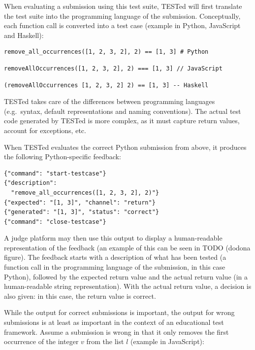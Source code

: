 \documentclass[../main]{subfiles}
\begin{document}
When evaluating a submission using this test suite, TESTed will first translate the test suite into the programming language of the submission.
Conceptually, each function call is converted into a test case (example in Python, JavaScript and Haskell):

\begin{verbatim}
remove_all_occurrences([1, 2, 3, 2], 2) == [1, 3] # Python
\end{verbatim}

\begin{verbatim}
removeAllOccurrences([1, 2, 3, 2], 2) === [1, 3] // JavaScript
\end{verbatim}

\begin{verbatim}
(removeAllOccurrences [1, 2, 3, 2] 2) == [1, 3] -- Haskell
\end{verbatim}

TESTed takes care of the differences between programming languages (e.g.\ syntax, default representations and naming conventions).
The actual test code generated by TESTed is more complex, as it must capture return values, account for exceptions, etc.

When TESTed evaluates the correct Python submission from above, it produces the following Python-specific feedback:

\begin{verbatim}
{"command": "start-testcase"}
{"description":
  "remove_all_occurrences([1, 2, 3, 2], 2)"}
{"expected": "[1, 3]", "channel": "return"}
{"generated": "[1, 3]", "status": "correct"}
{"command": "close-testcase"}
\end{verbatim}

A judge platform may then use this output to display a human-readable representation of the feedback (an example of this can be seen in TODO (dodona figure).
The feedback starts with a description of what has been tested (a function call in the programming language of the submission, in this case Python), followed by the expected return value and the actual return value (in a human-readable string representation).
With the actual return value, a decision is also given: in this case, the return value is correct.

While the output for correct submissions is important, the output for wrong submissions is at least as important in the context of an educational test framework.
Assume a submission is wrong in that it only removes the first occurrence of the integer $v$ from the list $l$ (example in JavaScript):
\end{document}
